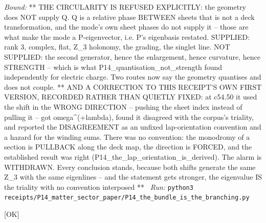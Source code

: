 \begin{description}
 \emph{Bound:} ** THE CIRCULARITY IS REFUSED EXPLICITLY: the geometry does NOT supply Q. Q is a relative phase BETWEEN sheets that is not a deck transformation, and the mode's own sheet phases do not supply it -- those are what make the mode a P-eigenvector, i.e. P's eigenbasis restated. SUPPLIED: rank 3, complex, flat, Z\_3 holonomy, the grading, the singlet line. NOT SUPPLIED: the second generator, hence the enlargement, hence curvature, hence STRENGTH -- which is what P14\_quantisation\_not\_strength found independently for electric charge. Two routes now say the geometry quantises and does not couple. ** AND A CORRECTION TO THIS RECEIPT'S OWN FIRST VERSION, RECORDED RATHER THAN QUIETLY FIXED: at c54.50 it used the shift in the WRONG DIRECTION -- pushing the sheet index instead of pulling it -- got omega\textasciicircum{}(+lambda), found it disagreed with the corpus's triality, and reported the DISAGREEMENT as an unfixed lap-orientation convention and a hazard for the winding sums. There was no convention: the monodromy of a section is PULLBACK along the deck map, the direction is FORCED, and the established result was right (P14\_the\_lap\_orientation\_is\_derived). The alarm is WITHDRAWN. Every conclusion stands, because both shifts generate the same Z\_3 with the same eigenlines -- and the statement gets stronger, the eigenvalue IS the triality with no convention interposed **
\ \emph{Run:} \texttt{python3 receipts/P14\_matter\_sector\_paper/P14\_the\_bundle\_is\_the\_branching.py}
\item[\rcptlabel{P14_the_lap_orientation_is_derived}{P14R27}\textbf{P14R27}\quad\texttt{P14\_the\_lap\_orientation\_is\_derived}]\hfill\textsf{[OK]}\\

\end{description}
